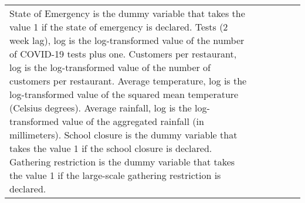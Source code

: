 \begin{table}[!htbp]
\begin{tabular}{@{\extracolsep{1pt}}lccccc}
{{State of Emergency is the dummy variable that takes the value 1 if the state of emergency is declared. 
Tests (2 week lag), log is the log-transformed value of the number of COVID-19 tests plus one.
Customers per restaurant, log is the log-transformed value of the number of customers per restaurant.
Average temperature, log is the log-transformed value of the squared mean temperature (Celsius degrees).
Average rainfall, log is the log-transformed value of the aggregated rainfall (in millimeters).
School closure is the dummy variable that takes the value 1 if the school closure is declared. 
Gathering restriction is the dummy variable that takes the value 1 if the large-scale gathering restriction is declared.}} \\
\end{tabular} 
\end{table} 
